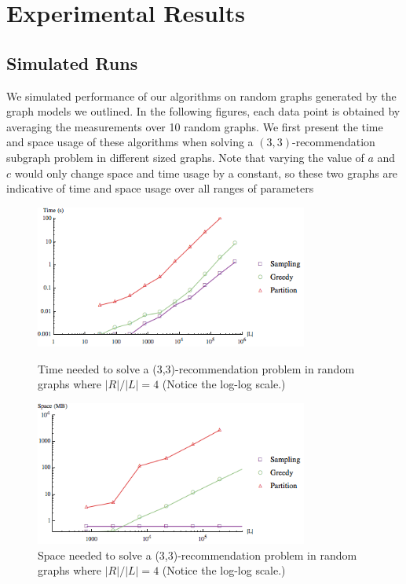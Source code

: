 \section{Experimental Results}

\subsection{Simulated Runs}
We simulated performance of our algorithms on random graphs generated
by the graph models we outlined. 
In the following figures, each data
point is obtained by averaging the measurements over 10 random
graphs. We first present the time and space usage of these algorithms when
solving a $(3,3)$-recommendation subgraph problem in different sized graphs.
Note that varying the value of $a$ and $c$ would only change space and time
usage by a constant, so these two graphs are indicative of time and space
usage over all ranges of parameters

\begin{figure}[t]
\centering
\begin{minipage}[h]{0.48\textwidth}
\centering
\includegraphics[width=0.8\textwidth]{images/time.png}
\caption{Time needed to solve a (3,3)-recommendation problem in random graphs where $|R|/|L|=4$ (Notice the log-log scale.)}\label{fig:time_graph}
\end{minipage}
\hspace{0cm}
\begin{minipage}[h]{0.48\textwidth}
\centering
\includegraphics[width=0.8\textwidth]{images/space.png}
\caption{Space needed to solve a (3,3)-recommendation problem in random graphs where $|R|/|L|=4$ (Notice the log-log scale.)}\label{fig:space_graph}
\end{minipage}
\vspace{-0.2in}
\end{figure}
\vs


